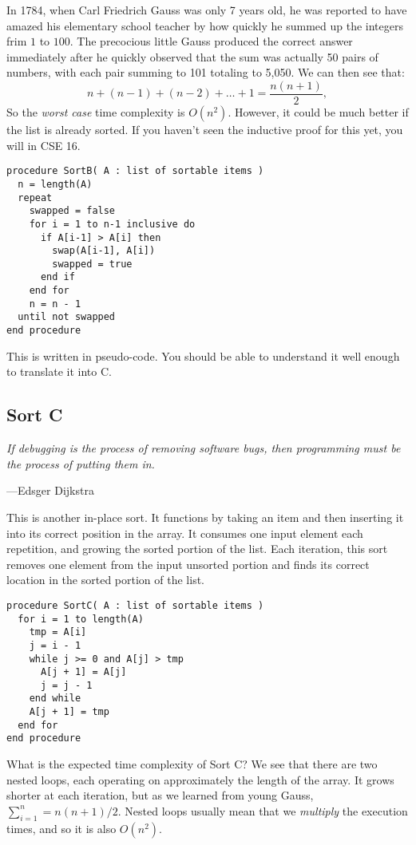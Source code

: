 \documentclass{article}
\begin{document}
In 1784, when Carl Friedrich Gauss was only 7 years old, he was reported to have amazed his elementary school teacher by how quickly he summed up the integers frim $1$ to $100$.
The precocious little Gauss produced the correct answer immediately after he quickly observed that the sum was actually 50 pairs of
numbers, with each pair summing to 101 totaling to 5,050. We can then see that:
$$
n+(n-1)+(n-2) + \ldots + 1 = \frac{n(n+1)}{2},
$$
So the \emph{worst case} time complexity is $O(n^2)$. However, it could be much
better if the list is already sorted. If you haven't seen the inductive
proof for this yet, you will in CSE 16.

\begin{lstlisting}[title=Sort B (pseudocode)]
procedure SortB( A : list of sortable items )
  n = length(A)
  repeat
    swapped = false
    for i = 1 to n-1 inclusive do
      if A[i-1] > A[i] then
        swap(A[i-1], A[i])
        swapped = true
      end if
    end for
    n = n - 1
  until not swapped
end procedure
\end{lstlisting}

This is written in pseudo-code. You should be able to understand it well enough
to translate it into C.

\subsection{Sort C} %
\epigraph{\emph{If debugging is the process of removing software bugs, then
programming must be the process of putting them in.}}{---Edsger Dijkstra}

\noindent This is another in-place sort. It functions by taking an
item and then inserting it into its correct position in the array.
It consumes one input element each repetition, and growing the
sorted portion of the list. Each iteration, this sort removes
one element from the input unsorted portion and
finds its correct location in the sorted portion of the list.

\begin{lstlisting}[title=Sort C (pseudocode)]
procedure SortC( A : list of sortable items )
  for i = 1 to length(A)
    tmp = A[i]
    j = i - 1
    while j >= 0 and A[j] > tmp
      A[j + 1] = A[j]
      j = j - 1
    end while
    A[j + 1] = tmp
  end for
end procedure
\end{lstlisting}

What is the expected time complexity of Sort C? We see
that
there are two nested loops, each operating on approximately the length of the array. It grows shorter at each iteration, but as we learned from young Gauss,
$\sum_{i=1}^n=n(n+1)/2$. Nested loops usually mean that we \emph{multiply} the
execution times, and so it is also $O(n^2)$.
\end{document}
